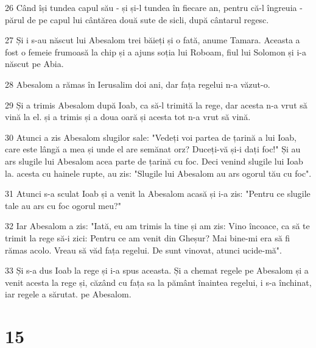 \par 26 Când își tundea capul său - și și-l tundea în fiecare an, pentru că-l îngreuia - părul de pe capul lui cântărea două sute de sicli, după cântarul regesc.
\par 27 Și i s-au născut lui Abesalom trei băieți și o fată, anume Tamara. Aceasta a fost o femeie frumoasă la chip și a ajuns soția lui Roboam, fiul lui Solomon și i-a născut pe Abia.
\par 28 Abesalom a rămas în Ierusalim doi ani, dar fața regelui n-a văzut-o.
\par 29 Și a trimis Abesalom după Ioab, ca să-l trimită la rege, dar acesta n-a vrut să vină la el. și a trimis și a doua oară și acesta tot n-a vrut să vină.
\par 30 Atunci a zis Abesalom slugilor sale: "Vedeți voi partea de țarină a lui Ioab, care este lângă a mea și unde el are semănat orz? Duceți-vă și-i dați foc!" Și au ars slugile lui Abesalom acea parte de țarină cu foc. Deci venind slugile lui Ioab la. acesta cu hainele rupte, au zis: "Slugile lui Abesalom au ars ogorul tău cu foc".
\par 31 Atunci s-a sculat Ioab și a venit la Abesalom acasă și i-a zis: "Pentru ce slugile tale au ars cu foc ogorul meu?"
\par 32 Iar Abesalom a zis: "Iată, eu am trimis la tine și am zis: Vino încoace, ca să te trimit la rege să-i zici: Pentru ce am venit din Gheșur? Mai bine-mi era să fi rămas acolo. Vreau să văd fața regelui. De sunt vinovat, atunci ucide-mă".
\par 33 Și s-a dus Ioab la rege și i-a spus aceasta. Și a chemat regele pe Abesalom și a venit acesta la rege și, căzând cu fața sa la pământ înaintea regelui, i s-a închinat, iar regele a sărutat. pe Abesalom.

\chapter{15}

